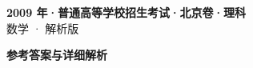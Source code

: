 \documentclass[zihao=-4, a4paper]{ctexart}
\begin{document}
\begin{center}
  {\Large\bfseries 2009 年·普通高等学校招生考试·北京卷·理科}\\[4pt]
  {\large 数学 · 解析版}
\end{center}
\medskip
{}

\clearpage
{}
\begin{center}{\Large\bfseries 参考答案与详细解析}\end{center}
\medskip

\end{document}
